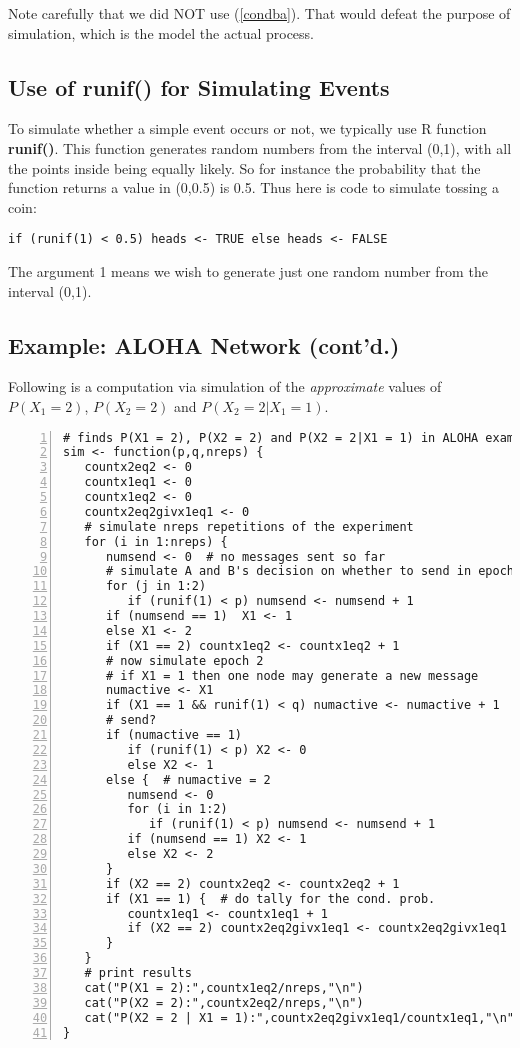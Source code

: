 Note carefully that we did NOT use (\ref{condba}).  That would defeat
the purpose of simulation, which is the model the actual process.

\subsection{Use of runif() for Simulating Events}

To simulate whether a simple event occurs or not, we typically use R
function {\bf runif()}.  This function generates random numbers from the
interval (0,1), with all the points inside being equally likely.  So for
instance the probability that the function returns a value in (0,0.5) is
0.5.  Thus here is code to simulate tossing a coin:

\begin{Verbatim}[fontsize=\relsize{-2}]
if (runif(1) < 0.5) heads <- TRUE else heads <- FALSE
\end{Verbatim}

The argument 1 means we wish to generate just one random number from the
interval (0,1).

\subsection{Example: ALOHA Network (cont'd.)}
\label{alohasim}

Following is a computation via simulation of the {\it approximate}
values of $P(X_1 = 2)$, $P(X_2 = 2)$ and $P(X_2 = 2 | X_1 = 1)$. 


\begin{Verbatim}[fontsize=\relsize{-2},numbers=left]
# finds P(X1 = 2), P(X2 = 2) and P(X2 = 2|X1 = 1) in ALOHA example
sim <- function(p,q,nreps) {
   countx2eq2 <- 0
   countx1eq1 <- 0
   countx1eq2 <- 0
   countx2eq2givx1eq1 <- 0
   # simulate nreps repetitions of the experiment
   for (i in 1:nreps) {
      numsend <- 0  # no messages sent so far
      # simulate A and B's decision on whether to send in epoch 1
      for (j in 1:2)
         if (runif(1) < p) numsend <- numsend + 1
      if (numsend == 1)  X1 <- 1
      else X1 <- 2
      if (X1 == 2) countx1eq2 <- countx1eq2 + 1
      # now simulate epoch 2
      # if X1 = 1 then one node may generate a new message
      numactive <- X1
      if (X1 == 1 && runif(1) < q) numactive <- numactive + 1
      # send?
      if (numactive == 1) 
         if (runif(1) < p) X2 <- 0
         else X2 <- 1
      else {  # numactive = 2
         numsend <- 0
         for (i in 1:2)
            if (runif(1) < p) numsend <- numsend + 1
         if (numsend == 1) X2 <- 1
         else X2 <- 2
      }
      if (X2 == 2) countx2eq2 <- countx2eq2 + 1
      if (X1 == 1) {  # do tally for the cond. prob.
         countx1eq1 <- countx1eq1 + 1
         if (X2 == 2) countx2eq2givx1eq1 <- countx2eq2givx1eq1 + 1
      }
   }
   # print results
   cat("P(X1 = 2):",countx1eq2/nreps,"\n")
   cat("P(X2 = 2):",countx2eq2/nreps,"\n")
   cat("P(X2 = 2 | X1 = 1):",countx2eq2givx1eq1/countx1eq1,"\n")
}
\end{Verbatim}

